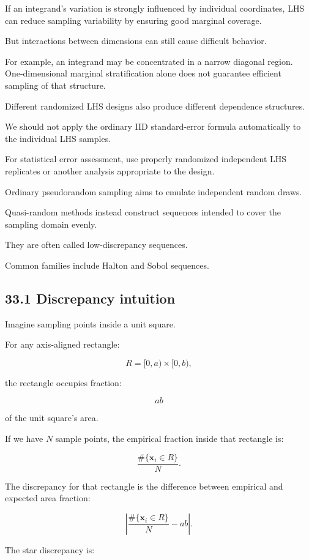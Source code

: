 If an integrand's variation is strongly influenced by individual coordinates, LHS can reduce sampling variability by ensuring good marginal coverage.

But interactions between dimensions can still cause difficult behavior.

For example, an integrand may be concentrated in a narrow diagonal region. One-dimensional marginal stratification alone does not guarantee efficient sampling of that structure.

Different randomized LHS designs also produce different dependence structures.

We should not apply the ordinary IID standard-error formula automatically to the individual LHS samples.

For statistical error assessment, use properly randomized independent LHS replicates or another analysis appropriate to the design.

Ordinary pseudorandom sampling aims to emulate independent random draws.

Quasi-random methods instead construct sequences intended to cover the sampling domain evenly.

They are often called low-discrepancy sequences.

Common families include Halton and Sobol sequences.

\subsection{33.1 Discrepancy intuition}\label{02-foundations-ii-ch031-discrepancy-intuition}

Imagine sampling points inside a unit square.

For any axis-aligned rectangle:

\[ R=[0,a)\times[0,b), \]

the rectangle occupies fraction:

\[ ab \]

of the unit square's area.

If we have \(N\) sample points, the empirical fraction inside that rectangle is:

\[ \frac{\#\{\mathbf x_i\in R\}}{N}. \]

The discrepancy for that rectangle is the difference between empirical and expected area fraction:

\[ \left| \frac{\#\{\mathbf x_i\in R\}}{N}-ab \right|. \]

The star discrepancy is:

